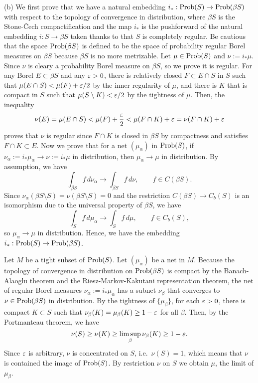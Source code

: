 \documentclass{../../large}
\begin{document}
\begin{pf}
(b)
We first prove that we have a natural embedding $i_*:\operatorname{Prob}(S)\to\operatorname{Prob}(\beta S)$ with respect to the topology of convergence in distribution, where $\beta S$ is the Stone-\v Cech compactification and the map $i_*$ is the pushforward of the natural embedding $i:S\to\beta S$ taken thanks to that $S$ is completely regular.
Be cautious that the space $\operatorname{Prob}(\beta S)$ is defined to be the space of probability regular Borel measures on $\beta S$ because $\beta S$ is no more metrizable.
Let $\mu\in\operatorname{Prob}(S)$ and $\nu:=i_*\mu$.
Since $\nu$ is cleary a probability Borel measure on $\beta S$, so we prove it is regular.
For any Borel $E\subset\beta S$ and any $\varepsilon>0$, there is relatively closed $F\subset E\cap S$ in $S$ such that $\mu(E\cap S)<\mu(F)+\varepsilon/2$ by the inner regularity of $\mu$, and there is $K$ that is compact in $S$ such that $\mu(S\setminus K)<\varepsilon/2$ by the tightness of $\mu$.
Then, the inequality
\[\nu(E)=\mu(E\cap S)<\mu(F)+\frac{\varepsilon}2<\mu(F\cap K)+\varepsilon=\nu(F\cap K)+\varepsilon\]
proves that $\nu$ is regular since $F\cap K$ is closed in $\beta S$ by compactness and satisfies $F\cap K\subset E$.
Now we prove that for a net $(\mu_\alpha)$ in $\operatorname{Prob}(S)$, if $\nu_\alpha:=i_*\mu_\alpha\to\nu:=i_*\mu$ in distribution, then $\mu_\alpha\to\mu$ in distribution.
By assumption, we have
\[\int_{\beta S}f\,d\nu_\alpha\to\int_{\beta S}f\,d\nu,\qquad f\in C(\beta S).\]
Since $\nu_\alpha(\beta S\setminus S)=\nu(\beta S\setminus S)=0$ and the restriction $C(\beta S)\to C_b(S)$ is an isomorphism due to the universal property of $\beta S$, we have
\[\int_Sf\,d\mu_\alpha\to\int_Sf\,d\mu,\qquad f\in C_b(S),\] so $\mu_\alpha\to\mu$ in distribution.
Hence, we have the embedding $i_*:\operatorname{Prob}(S)\to\operatorname{Prob}(\beta S)$.

Let $M$ be a tight subset of $\operatorname{Prob}(S)$.
Let $(\mu_\alpha)$ be a net in $M$.
Because the topology of convergence in distribution on $\operatorname{Prob}(\beta S)$ is compact by the Banach-Alaoglu theorem and the Riesz-Markov-Kakutani representation theorem, the net of regular Borel measures $\nu_\alpha:=i_*\mu_\alpha$ has a subnet $\nu_\beta$ that converges to $\nu\in\operatorname{Prob}(\beta S)$ in distribution.
By the tightness of $\{\mu_\beta\}$, for each $\varepsilon>0$, there is compact $K\subset S$ such that $\nu_\beta(K)=\mu_\beta(K)\ge1-\varepsilon$ for all $\beta$.
Then, by the Portmanteau theorem, we have
\[\nu(S)\ge\nu(K)\ge\limsup_\beta\nu_\beta(K)\ge1-\varepsilon.\]
Since $\varepsilon$ is arbitrary, $\nu$ is concentrated on $S$, i.e.~$\nu(S)=1$, which means that $\nu$ is contained the image of $\operatorname{Prob}(S)$.
By restriction $\nu$ on $S$ we obtain $\mu$, the limit of $\mu_\beta$.
\end{pf}
\end{document}

